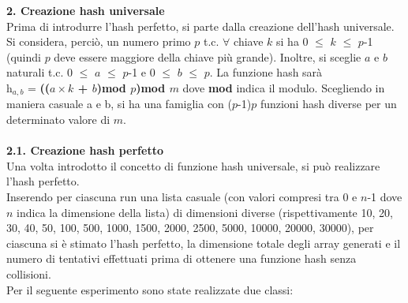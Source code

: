 \documentclass[]{article}
\begin{document}
\newpage
{\Large \textbf{2. Creazione hash universale}}\\
Prima di introdurre l'hash perfetto, si parte dalla creazione dell'hash universale. 
Si considera, perciò, un numero primo $p$ t.c. $\forall$ chiave $k$ si ha 0 $\leq$ $k$ $\leq$ $p$-1 (quindi $p$ deve essere maggiore della chiave più grande). 
Inoltre, si sceglie $a$ e $b$ naturali t.c. 0 $\leq$ $a$ $\leq$ $p$-1 e 0 $\leq$ $b$ $\leq$ $p$. 
La funzione hash sarà \\h$_{a,b}$ = \textbf{(($a \times k$ + $b$)mod $p$)mod $m$} dove \textbf{mod} indica il modulo. 
Scegliendo in maniera casuale a e b, si ha una famiglia con ($p$-1)$p$ funzioni hash diverse per un determinato valore di $m$.\\
\\

{\large \textbf{{\Large{2}}.{\small{1}}. Creazione hash perfetto}}\\
Una volta introdotto il concetto di funzione hash universale, si può realizzare l'hash perfetto.\\
Inserendo per ciascuna run una lista casuale (con valori compresi tra 0 e $n$-1 dove $n$ indica la dimensione della lista) di dimensioni diverse 
(rispettivamente 10, 20, 30, 40, 50, 100, 500, 1000, 1500, 2000, 2500, 5000, 10000, 20000, 30000), per ciascuna si è stimato l'hash perfetto, 
la dimensione totale degli array generati e il numero di tentativi effettuati prima di ottenere una funzione hash senza collisioni.\\
Per il seguente esperimento sono state realizzate due classi: 
\end{document}
